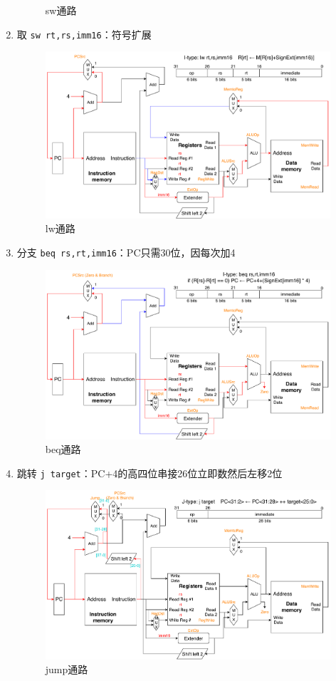 \begin{enumerate}
\begin{figure}[htbp]
\caption{sw通路}
\end{figure}
	\item 取 \verb'sw rt,rs,imm16'：符号扩展
\begin{figure}[htbp]
\centering
\includegraphics[width=\linewidth]{fig/Datapath_lw.pdf}
\caption{lw通路}
\end{figure}
	\item 分支 \verb'beq rs,rt,imm16'：PC只需30位，因每次加4
\begin{figure}[htbp]
\centering
\includegraphics[width=\linewidth]{fig/Datapath_beq.pdf}
\caption{beq通路}
\end{figure}
	\item 跳转 \verb'j target'：PC+4的高四位串接26位立即数然后左移2位
\begin{figure}[htbp]
\centering
\includegraphics[width=\linewidth]{fig/Datapath_jump.pdf}
\caption{jump通路}
\end{figure}
\end{enumerate}

